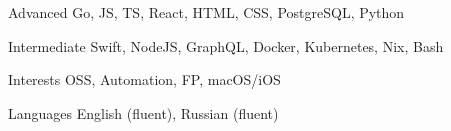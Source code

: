 
\begin{cvskills}

  \cvskill
    {Advanced}
    {Go, JS, TS, React, HTML, CSS, PostgreSQL, Python}

    \cvskill
    {Intermediate}
    {Swift, NodeJS, GraphQL, Docker, Kubernetes, Nix, Bash}

   \cvskill
    {Interests}
    {OSS, Automation, FP, macOS/iOS}

  \cvskill
    {Languages}
    {English (fluent), Russian (fluent)}

\end{cvskills}
